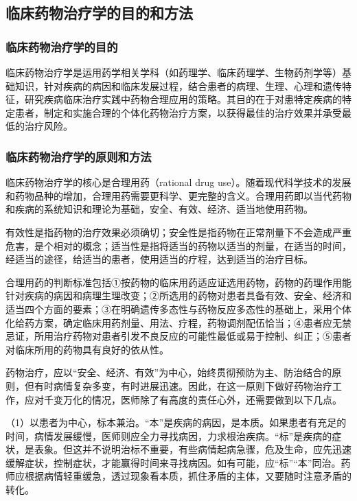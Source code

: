 \subsection{临床药物治疗学的目的和方法}

\subsubsection{临床药物治疗学的目的}

临床药物治疗学是运用药学相关学科（如药理学、临床药理学、生物药剂学等）基础知识，针对疾病的病因和临床发展过程，结合患者的病理、生理、心理和遗传特征，研究疾病临床治疗实践中药物合理应用的策略。其目的在于对患特定疾病的特定患者，制定和实施合理的个体化药物治疗方案，以获得最佳的治疗效果并承受最低的治疗风险。

\subsubsection{临床药物治疗学的原则和方法}

临床药物治疗学的核心是合理用药（rational drug
use）。随着现代科学技术的发展和药物品种的增加，合理用药需要更科学、更完整的含义。合理用药即以当代药物和疾病的系统知识和理论为基础，安全、有效、经济、适当地使用药物。

有效性是指药物的治疗效果必须确切；安全性是指药物在正常剂量下不会造成严重危害，是个相对的概念；适当性是指将适当的药物以适当的剂量，在适当的时间，经适当的途径，给适当的患者，使用适当的疗程，达到适当的治疗目标。

合理用药的判断标准包括①按药物的临床用药适应证选用药物，药物的药理作用能针对疾病的病因和病理生理改变；②所选用的药物对患者具备有效、安全、经济和适当四个方面的要素；③在明确遗传多态性与药物反应多态性的基础上，采用个体化给药方案，确定临床用药剂量、用法、疗程，药物调剂配伍恰当；④患者应无禁忌证，所用治疗药物对患者引发不良反应的可能性最低或易于控制、纠正；⑤患者对临床所用的药物具有良好的依从性。

药物治疗，应以“安全、经济、有效”为中心，始终贯彻预防为主、防治结合的原则，但有时病情复杂多变，有时进展迅速。因此，在这一原则下做好药物治疗工作，应对千变万化的情况，医师除了有高度的责任心外，还需要做到以下几点。

（1）以患者为中心，标本兼治。“本”是疾病的病因，是本质。如果患者有充足的时间，病情发展缓慢，医师则应全力寻找病因，力求根治疾病。“标”是疾病的症状，是表象。但这并不说明治标不重要，有些病情起病急骤，危及生命，应先迅速缓解症状，控制症状，才能赢得时间来寻找病因。如有可能，应“标”“本”同治。药师应根据病情轻重缓急，透过现象看本质，抓住矛盾的主体，又要随时注意矛盾的转化。

